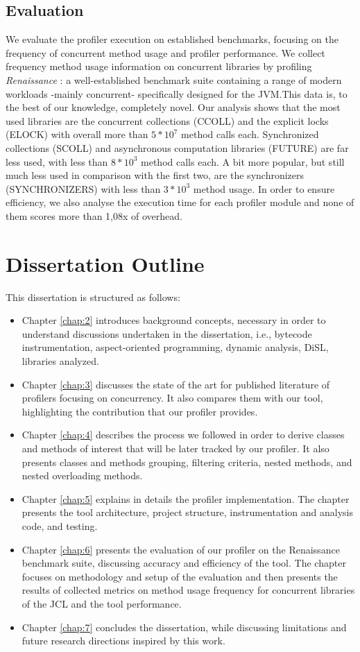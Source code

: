 \documentclass[]{usiinfthesis}
\begin{document}
\subsection{Evaluation}
We evaluate the profiler execution on established benchmarks, focusing on the frequency of concurrent method usage and profiler performance. We collect frequency method usage information on concurrent libraries by profiling \textit{Renaissance} \cite{Renaissance}: a well-established benchmark suite containing a range of modern workloads -mainly concurrent- specifically designed for the JVM.This data is, to the best of our knowledge, completely novel. Our analysis shows that the most used libraries are the concurrent collections (CCOLL) and the explicit locks (ELOCK) with overall more than \(5*10^7\) method calls each. Synchronized collections (SCOLL) and asynchronous computation libraries (FUTURE) are far less used, with less than \(8*10^3\) method calls each. A bit more popular, but still much less used in comparison with the first two, are the synchronizers (SYNCHRONIZERS) with less than \(3*10^3\) method usage. In order to ensure efficiency, we also analyse the execution time for each profiler module and none of them scores more than 1,08x of overhead.

\section{Dissertation Outline} \label{sec:1.4}
This dissertation is structured as follows:
\begin{itemize}
    \item Chapter \ref{chap:2} introduces background concepts, necessary in order to understand discussions undertaken in the dissertation, i.e., bytecode instrumentation, aspect-oriented programming, dynamic analysis, DiSL, libraries analyzed.
    \item Chapter \ref{chap:3} discusses the state of the art for published literature of profilers focusing on concurrency. It also compares them with our tool, highlighting the contribution that our profiler provides.
    \item Chapter \ref{chap:4} describes the process we followed in order to derive classes and methods of interest that will be later tracked by our profiler. It also presents classes and methods grouping, filtering criteria, nested methods, and nested overloading methods.
    \item Chapter \ref{chap:5} explains in details the profiler implementation. The chapter presents the tool architecture, project structure, instrumentation and analysis code, and testing.
    \item Chapter \ref{chap:6} presents the evaluation of our profiler on the Renaissance benchmark suite, discussing accuracy and efficiency of the tool. The chapter focuses on methodology and setup of the evaluation and then presents the results of collected metrics on method usage frequency for concurrent libraries of the JCL and the tool performance.
    \item Chapter \ref{chap:7} concludes the dissertation, while discussing limitations and future research directions inspired by this work.
\end{itemize}
\end{document}
